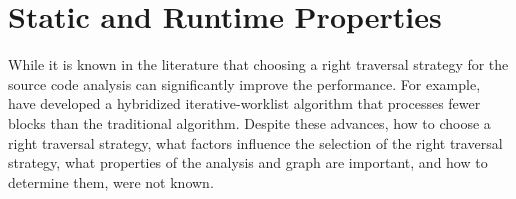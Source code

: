 

\section{Static and Runtime Properties}
\label{sec:compute-properties}
While it is known in the literature that choosing a right traversal strategy for
the source code analysis can significantly improve the
performance. For example, ~\cite{atkinson2001implementation} have developed a hybridized iterative-worklist algorithm that processes fewer blocks than the traditional algorithm. Despite these advances, how to choose a right traversal
strategy, what factors influence the selection of the right traversal strategy,
what properties of the analysis and graph are important, and how to determine
them, were not known.

